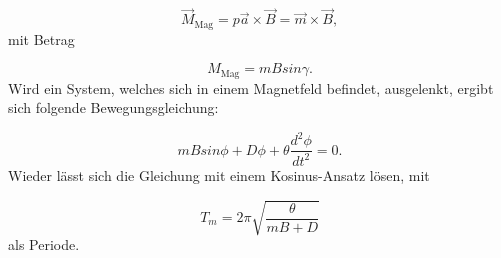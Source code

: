 \begin{equation}
  \vec{M}_\text{Mag} = p \vec{a} \times \vec{B} = \vec{m} \times \vec{B} ,
\end{equation}
mit Betrag

\begin{equation}
 M_\text{Mag} = m B sin\gamma .
\end{equation}
Wird ein System, welches sich in einem Magnetfeld befindet, ausgelenkt, ergibt sich folgende Bewegungsgleichung:

\begin{equation}
  m B sin\phi + D \phi + \theta \frac{d^{2}\phi}{dt^{2}} = 0 .
\end{equation}
Wieder lässt sich die Gleichung mit einem Kosinus-Ansatz lösen, mit

\begin{equation}
  T_m = 2\pi \sqrt{\frac{\theta}{m B + D}}
\end{equation}
als Periode.



